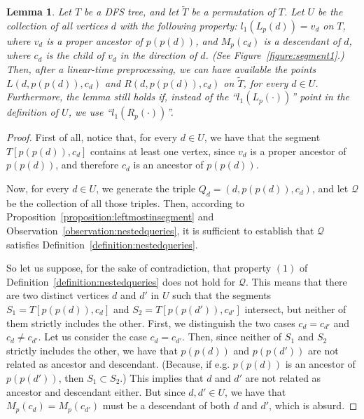 \documentclass[11pt,a4paper]{article}
\newtheorem{lemma}[theorem]{Lemma}
\begin{document}
\begin{lemma}
\label{lemma:segmentpointsL}
Let $T$ be a DFS tree, and let $\widetilde{T}$ be a permutation of $T$. Let $U$ be the collection of all vertices $d$ with the following property: $l_1(L_p(d))=v_d$ on $T$, where $v_d$ is a proper ancestor of $p(p(d))$, and $M_p(c_d)$ is a descendant of $d$, where $c_d$ is the child of $v_d$ in the direction of $d$. (See Figure~\ref{figure:segment1}.) Then, after a linear-time preprocessing, we can have available the points $L(d,p(p(d)),c_d)$ and $R(d,p(p(d)),c_d)$ on $\widetilde{T}$, for every $d\in U$. Furthermore, the lemma still holds if, instead of the ``$l_1(L_p(\cdot))$'' point in the definition of $U$, we use ``$l_1(R_p(\cdot))$''. 
\end{lemma}
\begin{proof}
First of all, notice that, for every $d\in U$, we have that the segment $T[p(p(d)),c_d]$ contains at least one vertex, since $v_d$ is a proper ancestor of $p(p(d))$, and therefore $c_d$ is an ancestor of $p(p(d))$.

Now, for every $d\in U$, we generate the triple $Q_d=(d,p(p(d)),c_d)$, and let $\mathcal{Q}$ be the collection of all those triples. Then, according to Proposition~\ref{proposition:leftmostinsegment} and Observation~\ref{observation:nestedqueries}, it is sufficient to establish that $\mathcal{Q}$ satisfies Definition~\ref{definition:nestedqueries}.

So let us suppose, for the sake of contradiction, that property $(1)$ of Definition~\ref{definition:nestedqueries} does not hold for $\mathcal{Q}$. This means that there are two distinct vertices $d$ and $d'$ in $U$ such that the segments $S_1=T[p(p(d)),c_d]$ and $S_2=T[p(p(d')),c_{d'}]$ intersect, but neither of them strictly includes the other. First, we distinguish the two cases $c_d=c_{d'}$ and $c_d\neq c_{d'}$. Let us consider the case $c_d=c_{d'}$. Then, since neither of $S_1$ and $S_2$ strictly includes the other, we have that $p(p(d))$ and $p(p(d'))$ are not related as ancestor and descendant. (Because, if e.g. $p(p(d))$ is an ancestor of $p(p(d'))$, then $S_1\subset S_2$.) This implies that $d$ and $d'$ are not related as ancestor and descendant either. But since $d,d'\in U$, we have that $M_p(c_d)=M_p(c_{d'})$ must be a descendant of both $d$ and $d'$, which is absurd. 


\end{proof}
\end{document}
